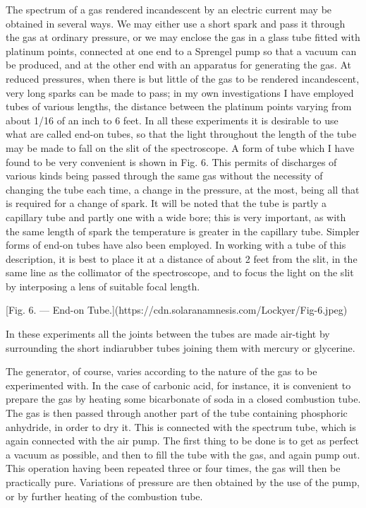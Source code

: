 \documentclass[a4paper, 12pt, oneside, polutonikogreek, english]{article}
\begin{document}
The spectrum of a gas rendered incandescent by an electric current may be obtained in several ways. We may either use a short spark and pass it through the gas at ordinary pressure, or we may enclose the gas in a glass tube fitted with platinum points, connected at one end to a Sprengel pump so that a vacuum can be produced, and at the other end with an apparatus for generating the gas. At reduced pressures, when there is but little of the gas to be rendered incandescent, very long sparks can be made to pass; in my own investigations I have employed tubes of various lengths, the distance between the platinum points varying from about 1/16 of an inch to 6 feet. In all these experiments it is desirable to use what are called end-on tubes, so that the light throughout the length of the tube may be made to fall on the slit of the spectroscope. A form of tube which I have found to be very convenient is shown in Fig. 6. This permits of discharges of various kinds being passed through the same gas without the necessity of changing the tube each time, a change in the pressure, at the most, being all that is required for a change of spark. It will be noted that the tube is partly a capillary tube and partly one with a wide bore; this is very important, as with the same length of spark the temperature is greater in the capillary tube. Simpler forms of end-on tubes have also been employed. In working with a tube of this description, it is best to place it at a distance of about 2 feet from the slit, in the same line as the collimator of the spectroscope, and to focus the light on the slit by interposing a lens of suitable focal length.

[Fig. 6. --- End-on Tube.](https://cdn.solaranamnesis.com/Lockyer/Fig-6.jpeg)

In these experiments all the joints between the tubes are made air-tight by surrounding the short indiarubber tubes joining them with mercury or glycerine.

The generator, of course, varies according to the nature of the gas to be experimented with. In the case of carbonic acid, for instance, it is convenient to prepare the gas by heating some bicarbonate of soda in a closed combustion tube. The gas is then passed through another part of the tube containing phosphoric anhydride, in order to dry it. This is connected with the spectrum tube, which is again connected with the air pump. The first thing to be done is to get as perfect a vacuum as possible, and then to fill the tube with the gas, and again pump out. This operation having been repeated three or four times, the gas will then be practically pure. Variations of pressure are then obtained by the use of the pump, or by further heating of the combustion tube.
\end{document}

